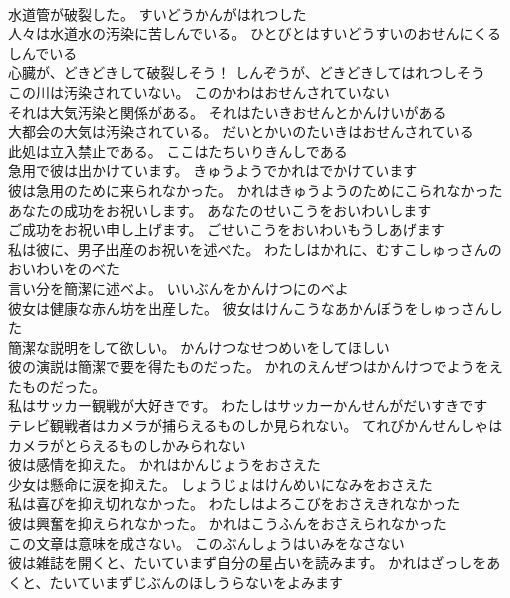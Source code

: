 \documentclass[8pt]{extreport}
\begin{document}
\begin{CJK}{UTF8}{min}
\\	水道管が破裂した。	すいどうかんがはれつした 
\\	人々は水道水の汚染に苦しんでいる。	ひとびとはすいどうすいのおせんにくるしんでいる 
\\	心臓が、どきどきして破裂しそう！	しんぞうが、どきどきしてはれつしそう 
\\	この川は汚染されていない。	このかわはおせんされていない 
\\	それは大気汚染と関係がある。	それはたいきおせんとかんけいがある 
\\	大都会の大気は汚染されている。	だいとかいのたいきはおせんされている 
\\	此処は立入禁止である。	ここはたちいりきんしである 
\\	急用で彼は出かけています。	きゅうようでかれはでかけています 
\\	彼は急用のために来られなかった。	かれはきゅうようのためにこられなかった 
\\	あなたの成功をお祝いします。	あなたのせいこうをおいわいします 
\\	ご成功をお祝い申し上げます。	ごせいこうをおいわいもうしあげます 
\\	私は彼に、男子出産のお祝いを述べた。	わたしはかれに、むすこしゅっさんのおいわいをのべた 
\\	言い分を簡潔に述べよ。	いいぶんをかんけつにのべよ 
\\	彼女は健康な赤ん坊を出産した。	彼女はけんこうなあかんぼうをしゅっさんした 
\\	簡潔な説明をして欲しい。	かんけつなせつめいをしてほしい 
\\	彼の演説は簡潔で要を得たものだった。	かれのえんぜつはかんけつでようをえたものだった。 
\\	私はサッカー観戦が大好きです。	わたしはサッカーかんせんがだいすきです 
\\	テレビ観戦者はカメラが捕らえるものしか見られない。	てれびかんせんしゃはカメラがとらえるものしかみられない 
\\	彼は感情を抑えた。	かれはかんじょうをおさえた 
\\	少女は懸命に涙を抑えた。	しょうじょはけんめいになみをおさえた 
\\	私は喜びを抑え切れなかった。	わたしはよろこびをおさえきれなかった 
\\	彼は興奮を抑えられなかった。	かれはこうふんをおさえられなかった 
\\	この文章は意味を成さない。	このぶんしょうはいみをなさない 
\\	彼は雑誌を開くと、たいていまず自分の星占いを読みます。	かれはざっしをあくと、たいていまずじぶんのほしうらないをよみます 

\end{CJK}
\end{document}
